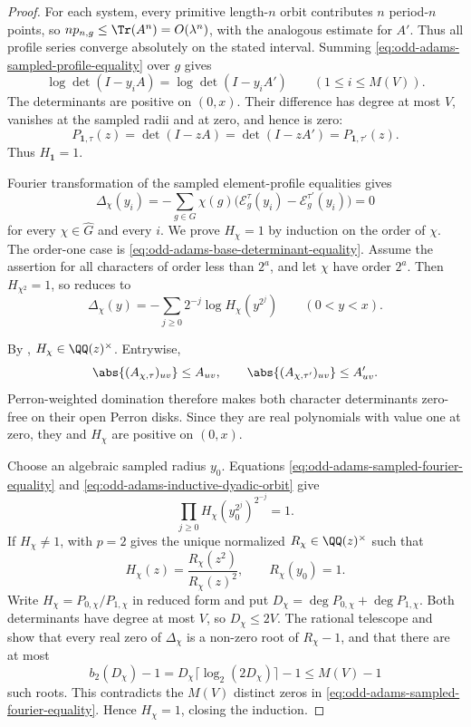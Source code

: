 \begin{proof}
For each system, every primitive length-\(n\) orbit contributes \(n\)
period-\(n\) points, so \(np_{n,g}\le\Tr(A^n)=O(\lambda^n)\), with the
analogous estimate for \(A'\).  Thus all profile series converge absolutely on
the stated interval.  Summing
\eqref{eq:odd-adams-sampled-profile-equality} over \(g\) gives
\[
 \log\det(I-y_iA)=\log\det(I-y_iA')
 \qquad(1\le i\le M(V)).
\]
The determinants are positive on \((0,x)\).  Their difference has degree at
most \(V\), vanishes at the sampled radii and at zero, and hence is zero:
\begin{equation}\label{eq:odd-adams-base-determinant-equality}
 P_{\mathbf1,\tau}(z)=\det(I-zA)=\det(I-zA')
 =P_{\mathbf1,\tau'}(z).
\end{equation}
Thus \(H_{\mathbf1}=1\).

Fourier transformation of the sampled element-profile equalities gives
\begin{equation}\label{eq:odd-adams-sampled-fourier-equality}
 \Delta_\chi(y_i)
 =-\sum_{g\in G}\chi(g)
   \bigl(\mathcal E_g^\tau(y_i)-\mathcal E_g^{\tau'}(y_i)\bigr)
 =0
\end{equation}
for every \(\chi\in\widehat G\) and every \(i\).  We prove
\(H_\chi=1\) by induction on the order of \(\chi\).  The order-one case is
\eqref{eq:odd-adams-base-determinant-equality}.  Assume the assertion for
all characters of order less than \(2^a\), and let \(\chi\) have order
\(2^a\).  Then \(H_{\chi^2}=1\), so
 reduces to
\begin{equation}\label{eq:odd-adams-inductive-dyadic-orbit}
 \Delta_\chi(y)
 =-\sum_{j\ge0}2^{-j}\log H_\chi(y^{2^j})
 \qquad(0<y<x).
\end{equation}

By , \(H_\chi\in\QQ(z)^\times\).
Entrywise,
\[
 \abs{(A_{\chi,\tau})_{uv}}\le A_{uv},\qquad
 \abs{(A_{\chi,\tau'})_{uv}}\le A'_{uv}.
\]
Perron-weighted domination therefore makes both character determinants
zero-free on their open Perron disks.  Since they are real polynomials with
value one at zero, they and \(H_\chi\) are positive on \((0,x)\).

Choose an algebraic sampled radius \(y_0\).  Equations
\eqref{eq:odd-adams-sampled-fourier-equality} and
\eqref{eq:odd-adams-inductive-dyadic-orbit} give
\[
 \prod_{j\ge0}H_\chi(y_0^{2^j})^{2^{-j}}=1.
\]
If \(H_\chi\ne1\),  with \(p=2\)
gives the unique normalized \(R_\chi\in\QQ(z)^\times\) such that
\[
 H_\chi(z)=\frac{R_\chi(z^2)}{R_\chi(z)^2},\qquad R_\chi(y_0)=1.
\]
Write \(H_\chi=P_{0,\chi}/P_{1,\chi}\) in reduced form and put
\(D_\chi=\deg P_{0,\chi}+\deg P_{1,\chi}\).  Both determinants have degree
at most \(V\), so \(D_\chi\le2V\).  The rational telescope and
 show that every real zero of
\(\Delta_\chi\) is a non-zero root of \(R_\chi-1\), and that there are at
most
\[
 b_2(D_\chi)-1
 =D_\chi\lceil\log_2(2D_\chi)\rceil-1
 \le M(V)-1
\]
such roots.  This contradicts the \(M(V)\) distinct zeros in
\eqref{eq:odd-adams-sampled-fourier-equality}.  Hence \(H_\chi=1\), closing
the induction.


\end{proof}
